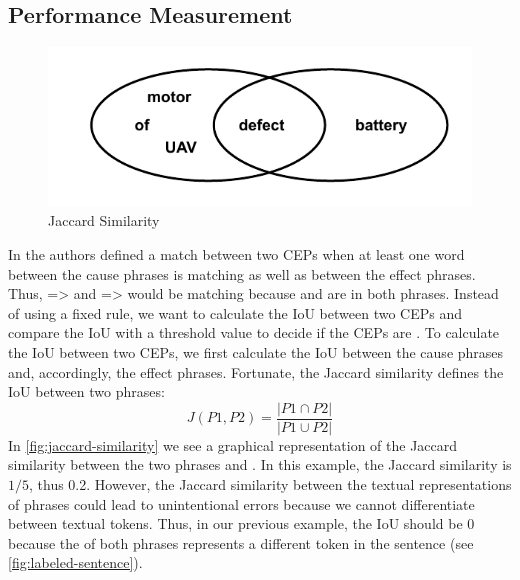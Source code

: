 \subsection{Performance Measurement}\label{subsec:performance-measurement}
\begin{figure}
    \begin{center}
        \includegraphics[scale=.85]{figures/evaluation_methods/jaccard_similarity}
        \caption{Jaccard Similarity}\label{fig:jaccard-similarity}
    \end{center}
\end{figure}
In \cite{pawar2021knowledge} the authors defined a match between two \ac{CEP}s when at least one word between the cause phrases is matching as well as between the effect phrases.
Thus,  =>  and  =>  would be matching because  and  are in both phrases.
Instead of using a fixed rule, we want to calculate the \ac{IoU} between two \ac{CEP}s and compare the \ac{IoU} with a threshold value to decide if the \ac{CEP}s are .
To calculate the \ac{IoU}  between two \ac{CEP}s, we first calculate the \ac{IoU}  between the cause phrases and, accordingly, the effect phrases.
Fortunate, the Jaccard similarity defines the \ac{IoU} between two phrases:
\begin{equation}
    \label{eq:jaccard-similarity}
    J(P1, P2) = \frac{\left| P1 \cap P2 \right|}{\left| P1 \cup P2 \right|}
\end{equation}
In \autoref{fig:jaccard-similarity} we see a graphical representation of the Jaccard similarity between the two phrases  and .
In this example, the Jaccard similarity is $1/5$, thus 0.2. However, the Jaccard similarity between the textual representations of phrases could lead to unintentional errors because we cannot differentiate between textual tokens.
Thus, in our previous example, the \ac{IoU} should be 0 because the  of both phrases represents a different token in the sentence (see \autoref{fig:labeled-sentence}).
